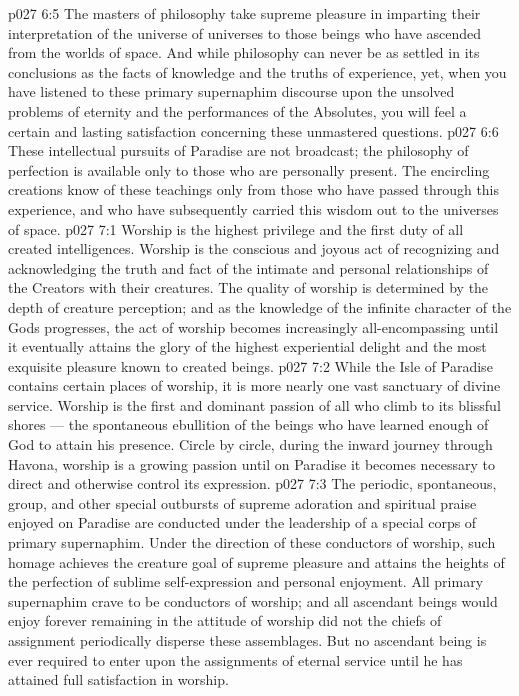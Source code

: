 \vs p027 6:5 The masters of philosophy take supreme pleasure in imparting their interpretation of the universe of universes to those beings who have ascended from the worlds of space. And while philosophy can never be as settled in its conclusions as the facts of knowledge and the truths of experience, yet, when you have listened to these primary supernaphim discourse upon the unsolved problems of eternity and the performances of the Absolutes, you will feel a certain and lasting satisfaction concerning these unmastered questions.
\vs p027 6:6 These intellectual pursuits of Paradise are not broadcast; the philosophy of perfection is available only to those who are personally present. The encircling creations know of these teachings only from those who have passed through this experience, and who have subsequently carried this wisdom out to the universes of space.
\vs p027 7:1 Worship is the highest privilege and the first duty of all created intelligences. Worship is the conscious and joyous act of recognizing and acknowledging the truth and fact of the intimate and personal relationships of the Creators with their creatures. The quality of worship is determined by the depth of creature perception; and as the knowledge of the infinite character of the Gods progresses, the act of worship becomes increasingly all\hyp{}encompassing until it eventually attains the glory of the highest experiential delight and the most exquisite pleasure known to created beings.
\vs p027 7:2 \pc While the Isle of Paradise contains certain places of worship, it is more nearly one vast sanctuary of divine service. Worship is the first and dominant passion of all who climb to its blissful shores --- the spontaneous ebullition of the beings who have learned enough of God to attain his presence. Circle by circle, during the inward journey through Havona, worship is a growing passion until on Paradise it becomes necessary to direct and otherwise control its expression.
\vs p027 7:3 The periodic, spontaneous, group, and other special outbursts of supreme adoration and spiritual praise enjoyed on Paradise are conducted under the leadership of a special corps of primary supernaphim. Under the direction of these conductors of worship, such homage achieves the creature goal of supreme pleasure and attains the heights of the perfection of sublime self\hyp{}expression and personal enjoyment. All primary supernaphim crave to be conductors of worship; and all ascendant beings would enjoy forever remaining in the attitude of worship did not the chiefs of assignment periodically disperse these assemblages. But no ascendant being is ever required to enter upon the assignments of eternal service until he has attained full satisfaction in worship.
